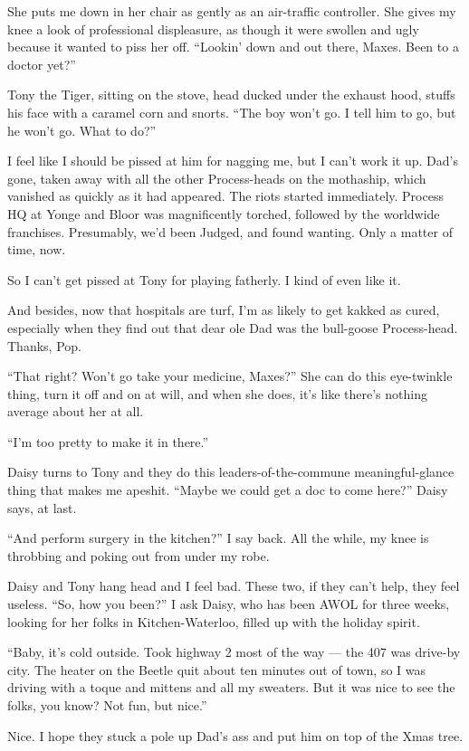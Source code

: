 She puts me down in her chair as gently as an air-traffic
controller. She gives my knee a look of professional displeasure,
as though it were swollen and ugly because it wanted to piss her
off. ``Lookin' down and out there, Maxes. Been to a doctor yet?''

Tony the Tiger, sitting on the stove, head ducked under the exhaust
hood, stuffs his face with a caramel corn and snorts.
``The boy won't go. I tell him to go, but he won't go. What to do?''

I feel like I should be pissed at him for nagging me, but I can't
work it up. Dad's gone, taken away with all the other Process-heads
on the mothaship, which vanished as quickly as it had appeared. The
riots started immediately. Process HQ at Yonge and Bloor was
magnificently torched, followed by the worldwide franchises.
Presumably, we'd been Judged, and found wanting. Only a matter of
time, now.

So I can't get pissed at Tony for playing fatherly. I kind of even
like it.

And besides, now that hospitals are turf, I'm as likely to get
kakked as cured, especially when they find out that dear ole Dad
was the bull-goose Process-head. Thanks, Pop.

``That right? Won't go take your medicine, Maxes?'' She can do this
eye-twinkle thing, turn it off and on at will, and when she does,
it's like there's nothing average about her at all.

``I'm too pretty to make it in there.''

Daisy turns to Tony and they do this leaders-of-the-commune
meaningful-glance thing that makes me apeshit.
``Maybe we could get a doc to come here?'' Daisy says, at last.

``And perform surgery in the kitchen?'' I say back. All the while,
my knee is throbbing and poking out from under my robe.

Daisy and Tony hang head and I feel bad. These two, if they can't
help, they feel useless. ``So, how you been?'' I ask Daisy, who has
been AWOL for three weeks, looking for her folks in
Kitchen-Waterloo, filled up with the holiday spirit.

``Baby, it's cold outside. Took highway 2 most of the way --- the 407 was 
drive-by city. The heater on the Beetle quit about ten minutes out of town, so 
I was driving with a toque and mittens and all my sweaters. But it was nice to 
see the folks, you know? Not fun, but nice.''

Nice. I hope they stuck a pole up Dad's ass and put him on top of
the Xmas tree.

